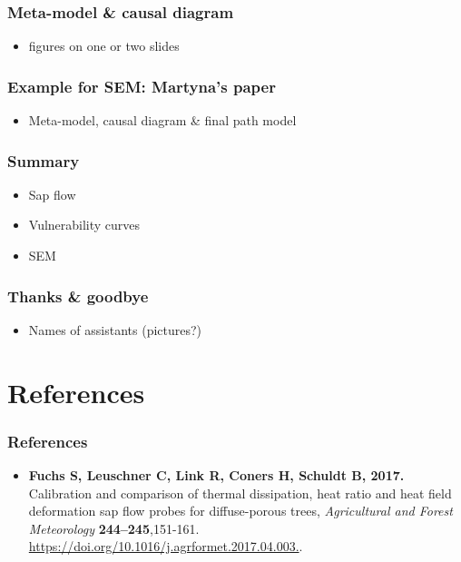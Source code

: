 \documentclass[usepdftitle=false]{beamer}
\begin{document}
\begin{frame}
	\frametitle{Meta-model \& causal diagram}
	\begin{itemize}
		\item figures on one or two slides		
	\end{itemize}
\end{frame}

\begin{frame}
	\frametitle{Example for SEM: Martyna's paper}
	\begin{itemize}
		\item Meta-model, causal diagram \& final path model	
	\end{itemize}
\end{frame}

\begin{frame}
	\frametitle{Summary}
	\begin{itemize}
		\item Sap flow
		\item Vulnerability curves
		\item SEM
	\end{itemize}
\end{frame}


\begin{frame}
	\frametitle{Thanks \& goodbye}
	\begin{itemize}
		\item Names of assistants (pictures?)
	\end{itemize}
\end{frame}

\section{References}
\begin{frame}
	\frametitle{References}
	\begin{itemize}
		\item \textbf{Fuchs S, Leuschner C, Link R, Coners H, Schuldt B, 2017.}
		Calibration and comparison of thermal dissipation, heat ratio and heat field deformation sap flow probes for diffuse-porous trees,
		\textit{Agricultural and Forest Meteorology} \textbf{244–245},151-161. \url{https://doi.org/10.1016/j.agrformet.2017.04.003.}.
	\end{itemize}
\end{frame}
\end{document}
